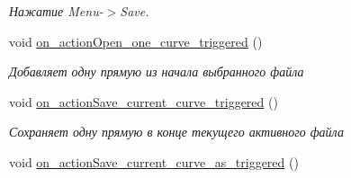 \begin{DoxyCompactItemize}
\begin{DoxyCompactList}\small\item\em Нажатие Menu-\/$>$Save. \end{DoxyCompactList}\item 
void \hyperlink{class_main_window_a0c0436c2de50da0d7cf5b26242a694ad}{on\+\_\+action\+Open\+\_\+one\+\_\+curve\+\_\+triggered} ()\hypertarget{class_main_window_a0c0436c2de50da0d7cf5b26242a694ad}{}\label{class_main_window_a0c0436c2de50da0d7cf5b26242a694ad}

\begin{DoxyCompactList}\small\item\em Добавляет одну прямую из начала выбранного файла \end{DoxyCompactList}\item 
void \hyperlink{class_main_window_adb1ff161c75d24a3aa5d5aa71e3cbb91}{on\+\_\+action\+Save\+\_\+current\+\_\+curve\+\_\+triggered} ()\hypertarget{class_main_window_adb1ff161c75d24a3aa5d5aa71e3cbb91}{}\label{class_main_window_adb1ff161c75d24a3aa5d5aa71e3cbb91}

\begin{DoxyCompactList}\small\item\em Сохраняет одну прямую в конце текущего активного файла \end{DoxyCompactList}\item 
void \hyperlink{class_main_window_ad0e13c15f3efed36489c68de4bb6434f}{on\+\_\+action\+Save\+\_\+current\+\_\+curve\+\_\+as\+\_\+triggered} ()
\end{DoxyCompactItemize}
